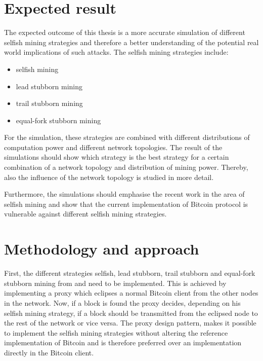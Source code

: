 \documentclass{scrartcl}
\begin{document}
\section{Expected result}
The expected outcome of this thesis is a more accurate simulation of different selfish mining strategies and therefore a better understanding of the potential real world implications of such attacks.
The selfish mining strategies include:
\begin{itemize}
\item selfish mining \cite{eyal2014majority}
\item lead stubborn mining \cite{nayak2016stubborn}
\item trail stubborn mining \cite{nayak2016stubborn}
\item equal-fork stubborn mining \cite{nayak2016stubborn}
\end{itemize}

For the simulation, these strategies are combined with different distributions of computation power and different network topologies.
The result of the simulations should show which strategy is the best strategy for a certain combination of a network topology and distribution of mining power.
Thereby, also the influence of the network topology is studied in more detail.

Furthermore, the simulations should emphasise the recent work in the area of selfish mining and show that the current implementation of Bitcoin protocol is vulnerable against different selfish mining strategies.

\section{Methodology and approach}
First, the different strategies selfish, lead stubborn, trail stubborn and equal-fork stubborn mining from \citeauthor{nayak2016stubborn} and \citeauthor{eyal2014majority} need to be implemented.
This is achieved by implementing a proxy which eclipses a normal Bitcoin client from the other nodes in the network.
Now, if a block is found the proxy decides, depending on his selfish mining strategy, if a block should be transmitted from the eclipsed node to the rest of the network or vice versa.
The proxy design pattern, makes it possible to implement the selfish mining strategies without altering the reference implementation of Bitcoin and is therefore preferred over an implementation directly in the Bitcoin client.
\end{document}
